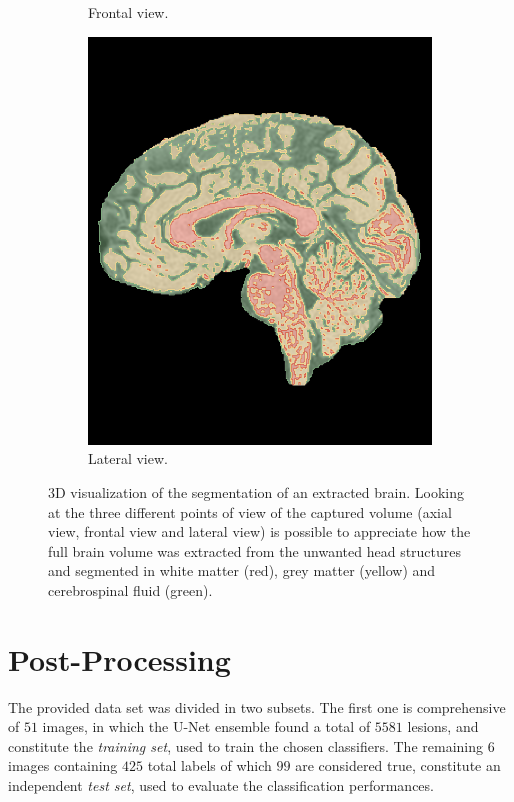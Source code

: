 \documentclass{standalone}
\begin{document}
\begin{figure}[h!]
\begin{subfigure}[b]{0.325\textwidth}
             \caption{Frontal view.}
        \end{subfigure}
        \hfill
        \begin{subfigure}[b]{0.33\textwidth}
             \includegraphics[scale=0.21]{img/Chap3/segmented_lateral.png}
             \caption{Lateral view.}
        \end{subfigure}
        \caption{3D visualization of the segmentation of an extracted brain. Looking at the three different points of view of the captured volume (axial view, frontal view and lateral view) is possible to appreciate how the full brain volume was extracted from the unwanted head structures and  segmented in white matter (red), grey matter (yellow) and cerebrospinal fluid (green).} \label{fig:3Dseg}
        \end{figure}


\section{Post-Processing}

The provided data set was divided in two subsets. The first one is comprehensive of $51$ images, in which the U-Net ensemble found a total of $5581$ lesions, and constitute the \textit{training set}, used to train the chosen classifiers.
The remaining $6$ images containing $425$ total labels of which $99$ are considered true, constitute an independent \textit{test set}, used to evaluate the classification performances.
\end{document}
